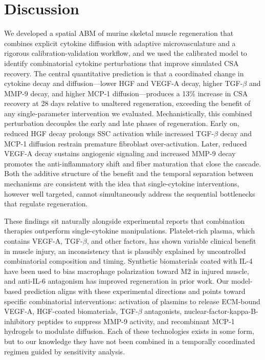 \documentclass[10pt,letterpaper]{article}
\begin{document}
\section{Discussion}
\label{sec:discussion}

We developed a spatial ABM of murine skeletal muscle regeneration that combines explicit cytokine diffusion with adaptive microvasculature and a rigorous calibration-validation workflow, and we used the calibrated model to identify combinatorial cytokine perturbations that improve simulated CSA recovery. The central quantitative prediction is that a coordinated change in cytokine decay and diffusion---lower HGF and VEGF-A decay, higher TGF-$\beta$ and MMP-9 decay, and higher MCP-1 diffusion---produces a 13\% increase in CSA recovery at 28 days relative to unaltered regeneration, exceeding the benefit of any single-parameter intervention we evaluated. Mechanistically, this combined perturbation decouples the early and late phases of regeneration. Early on, reduced HGF decay prolongs SSC activation while increased TGF-$\beta$ decay and MCP-1 diffusion restrain premature fibroblast over-activation. Later, reduced VEGF-A decay sustains angiogenic signaling and increased MMP-9 decay promotes the anti-inflammatory shift and fiber maturation that close the cascade. Both the additive structure of the benefit and the temporal separation between mechanisms are consistent with the idea that single-cytokine interventions, however well targeted, cannot simultaneously address the sequential bottlenecks that regulate regeneration.

These findings sit naturally alongside experimental reports that combination therapies outperform single-cytokine manipulations. Platelet-rich plasma, which contains VEGF-A, TGF-$\beta$, and other factors, has shown variable clinical benefit in muscle injury, an inconsistency that is plausibly explained by uncontrolled combinatorial composition and timing. Synthetic biomaterials coated with IL-4 have been used to bias macrophage polarization toward M2 in injured muscle, and anti-IL-6 antagonism has improved regeneration in prior work. Our model-based prediction aligns with these experimental directions and points toward specific combinatorial interventions: activation of plasmins to release ECM-bound VEGF-A, HGF-coated biomaterials, TGF-$\beta$ antagonists, nuclear-factor-kappa-B-inhibitory peptides to suppress MMP-9 activity, and recombinant MCP-1 hydrogels to modulate diffusion. Each of these technologies exists in some form, but to our knowledge they have not been combined in a temporally coordinated regimen guided by sensitivity analysis.
\end{document}
